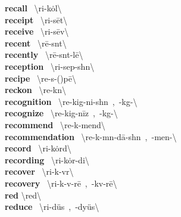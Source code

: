 \documentclass[10pt,a4paper]{article}
\begin{document}
\begin{multicols}{2}
\textbf{ recall }\quad \ \textbackslash ri-\textprimstress k\.{o}l\textbackslash \\
\textbf{ receipt }\quad \ \textbackslash ri-\textprimstress s\={e}t\textbackslash \\
\textbf{ receive }\quad \ \textbackslash ri-\textprimstress s\={e}v\textbackslash \\
\textbf{ recent }\quad \ \textbackslash \textprimstress r\={e}-s\textsuperscript{\textreve}nt\textbackslash \\
\textbf{ recently }\quad \ \textbackslash \textprimstress r\={e}-s\textsuperscript{\textreve}nt-l\={e}\textbackslash \\
\textbf{ reception }\quad \ \textbackslash ri-\textprimstress sep-sh\textschwa n\textbackslash \\
\textbf{ recipe }\quad \ \textbackslash \textprimstress re-s\textschwa -(\textsecstress )p\={e}\textbackslash \\
\textbf{ reckon }\quad \ \textbackslash \textprimstress re-k\textschwa n\textbackslash \\
\textbf{ recognition }\quad \ \textbackslash \textsecstress re-kig-\textprimstress ni-sh\textschwa n\ ,\ -k\textschwa g-\textbackslash \\
\textbf{ recognize }\quad \ \textbackslash \textprimstress re-kig-\textsecstress n\={i}z\ ,\ -k\textschwa g-\textbackslash \\
\textbf{ recommend }\quad \ \textbackslash \textsecstress re-k\textschwa -\textprimstress mend\textbackslash \\
\textbf{ recommendation }\quad \ \textbackslash \textsecstress re-k\textschwa -m\textschwa n-\textprimstress d\={a}-sh\textschwa n\ ,\ -\textsecstress men-\textbackslash \\
\textbf{ record }\quad \ \textbackslash ri-\textprimstress k\.{o}rd\textbackslash \\
\textbf{ recording }\quad \ \textbackslash ri-\textprimstress k\.{o}r-di\engma \textbackslash \\
\textbf{ recover }\quad \ \textbackslash ri-\textprimstress k\textschwa -v\textschwa r\textbackslash \\
\textbf{ recovery }\quad \ \textbackslash ri-\textprimstress k\textschwa -v\textschwa -r\={e}\ ,\ -\textprimstress k\textschwa v-r\={e}\textbackslash \\
\textbf{ red }\quad \textbackslash \textprimstress red\textbackslash \\
\textbf{ reduce }\quad \ \textbackslash ri-\textprimstress d\"{u}s\ ,\ -\textprimstress dy\"{u}s\textbackslash \\

\end{multicols}
\end{document}
